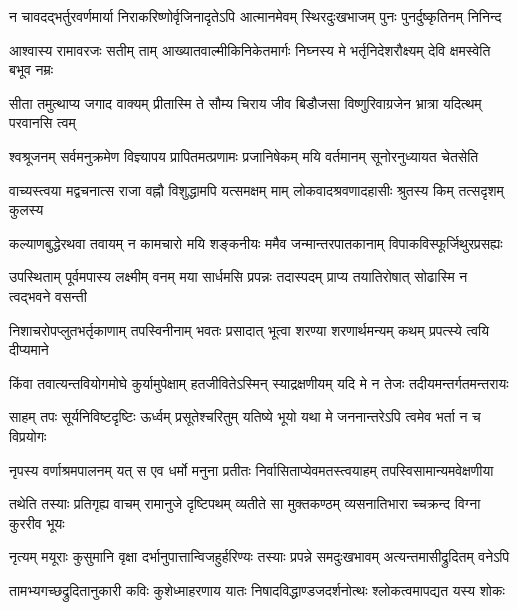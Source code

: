 \fourlineindentedshloka
{न चावदद्भर्तुरवर्णमार्या}
{निराकरिष्णोर्वृजिनादृतेऽपि}
{आत्मानमेवम् स्थिरदुःखभाजम्}
{पुनः पुनर्दुष्कृतिनम् निनिन्द} %

\fourlineindentedshloka
{आश्वास्य रामावरजः सतीम् ताम्}
{आख्यातवाल्मीकिनिकेतमार्गः}
{निघ्नस्य मे भर्तृनिदेशरौक्ष्यम्}
{देवि क्षमस्वेति बभूव नम्रः} %

\fourlineindentedshloka
{सीता तमुत्थाप्य जगाद वाक्यम्}
{प्रीतास्मि ते सौम्य चिराय जीव}
{बिडौजसा विष्णुरिवाग्रजेन}
{भ्रात्रा यदित्थम् परवानसि त्वम्} %

\fourlineindentedshloka
{श्वश्रूजनम् सर्वमनुक्रमेण}
{विज्ञ्यापय प्रापितमत्प्रणामः}
{प्रजानिषेकम् मयि वर्तमानम्}
{सूनोरनुध्यायत चेतसेति} %

\fourlineindentedshloka
{वाच्यस्त्वया मद्वचनात्स राजा}
{वह्नौ विशुद्धामपि यत्समक्षम्}
{माम् लोकवादश्रवणादहासीः}
{श्रुतस्य किम् तत्सदृशम् कुलस्य} %

\fourlineindentedshloka
{कल्याणबुद्धेरथवा तवायम्}
{न कामचारो मयि शङ्कनीयः}
{ममैव जन्मान्तरपातकानाम्}
{विपाकविस्फूर्जिथुरप्रसह्यः} %

\fourlineindentedshloka
{उपस्थिताम् पूर्वमपास्य लक्ष्मीम्}
{वनम् मया सार्धमसि प्रपन्नः}
{तदास्पदम् प्राप्य तयातिरोषात्}
{सोढास्मि न त्वद्भवने वसन्ती} %

\fourlineindentedshloka
{निशाचरोपप्लुतभर्तृकाणाम्}
{तपस्विनीनाम् भवतः प्रसादात्}
{भूत्वा शरण्या शरणार्थमन्यम्}
{कथम् प्रपत्स्ये त्वयि दीप्यमाने} %

\fourlineindentedshloka
{किंवा तवात्यन्तवियोगमोघे}
{कुर्यामुपेक्षाम् हतजीवितेऽस्मिन्}
{स्याद्रक्षणीयम् यदि मे न तेजः}
{तदीयमन्तर्गतमन्तरायः} %

\fourlineindentedshloka
{साहम् तपः सूर्यनिविष्टदृष्टिः}
{ऊर्ध्वम् प्रसूतेश्चरितुम् यतिष्ये}
{भूयो यथा मे जननान्तरेऽपि}
{त्वमेव भर्ता न च विप्रयोगः} %

\fourlineindentedshloka
{नृपस्य वर्णाश्रमपालनम् यत्}
{स एव धर्मो मनुना प्रतीतः}
{निर्वासिताप्येवमतस्त्वयाहम्}
{तपस्विसामान्यमवेक्षणीया} %

\fourlineindentedshloka
{तथेति तस्याः प्रतिगृह्य वाचम्}
{रामानुजे दृष्टिपथम् व्यतीते}
{सा मुक्तकण्ठम् व्यसनातिभारा}
{च्चक्रन्द विग्ना कुररीव भूयः} %

\fourlineindentedshloka
{नृत्यम् मयूराः कुसुमानि वृक्षा}
{दर्भानुपात्तान्विजहुर्हरिण्यः}
{तस्याः प्रपन्ने समदुःखभावम्}
{अत्यन्तमासीद्रुदितम् वनेऽपि} %

\fourlineindentedshloka
{तामभ्यगच्छद्रुदितानुकारी}
{कविः कुशेध्माहरणाय यातः}
{निषादविद्धाण्डजदर्शनोत्थः}
{श्लोकत्वमापद्यत यस्य शोकः} %

